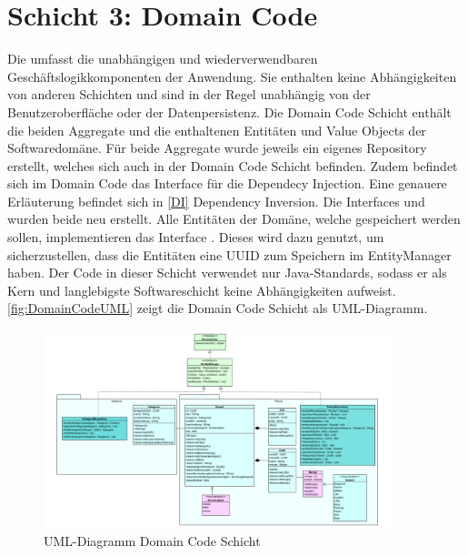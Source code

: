 \section{Schicht 3: Domain Code}
Die \href{https://github.com/MichaelaHaag/RezeptApp/tree/main/3-Domain-Code}{} umfasst die unabhängigen und wiederverwendbaren Geschäftslogikkomponenten der Anwendung. Sie enthalten keine Abhängigkeiten von anderen Schichten und sind in der Regel unabhängig von der Benutzeroberfläche oder der Datenpersistenz.
Die Domain Code Schicht enthält die beiden Aggregate und die enthaltenen Entitäten und Value Objects der Softwaredomäne. Für beide Aggregate wurde jeweils ein eigenes Repository erstellt, welches sich auch in der Domain Code Schicht befinden. Zudem befindet sich im Domain Code das Interface \href{https://github.com/MichaelaHaag/RezeptApp/tree/main/3-Domain-Code/src/main/java/de/rezeptapp/domain/IEntityManager.java}{} für die Dependecy Injection. Eine genauere Erläuterung befindet sich in \autoref{DI} Dependency Inversion. Die Interfaces  und \href{https://github.com/MichaelaHaag/RezeptApp/tree/main/3-Domain-Code/src/main/java/de/rezeptapp/domain/IPersistierbar.java}{} wurden beide neu erstellt. Alle Entitäten der Domäne, welche gespeichert werden sollen, implementieren das Interface . Dieses wird dazu genutzt, um sicherzustellen, dass die Entitäten eine UUID zum Speichern im EntityManager haben.
Der Code in dieser Schicht verwendet nur Java-Standards, sodass er als Kern und langlebigste Softwareschicht keine Abhängigkeiten aufweist. \autoref{fig:DomainCodeUML} zeigt die Domain Code Schicht als UML-Diagramm. 
\begin{figure}[ht]
	\centering
	\includegraphics[width=0.90\textwidth]{Bilder/DomainCode-UML.png} 
	\caption{UML-Diagramm Domain Code Schicht}
	\label{fig:DomainCodeUML}
\end{figure}

